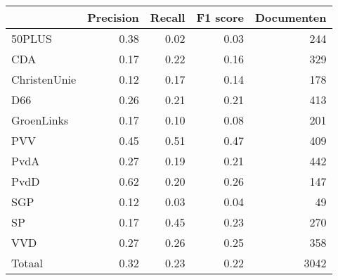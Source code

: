 \begin{tabular}{lrrrr}
\toprule
{} &  Precision &  Recall &  F1 score &  Documenten \\
\midrule
50PLUS       &       0.38 &    0.02 &      0.03 &         244 \\
CDA          &       0.17 &    0.22 &      0.16 &         329 \\
ChristenUnie &       0.12 &    0.17 &      0.14 &         178 \\
D66          &       0.26 &    0.21 &      0.21 &         413 \\
GroenLinks   &       0.17 &    0.10 &      0.08 &         201 \\
PVV          &       0.45 &    0.51 &      0.47 &         409 \\
PvdA         &       0.27 &    0.19 &      0.21 &         442 \\
PvdD         &       0.62 &    0.20 &      0.26 &         147 \\
SGP          &       0.12 &    0.03 &      0.04 &          49 \\
SP           &       0.17 &    0.45 &      0.23 &         270 \\
VVD          &       0.27 &    0.26 &      0.25 &         358 \\
Totaal       &       0.32 &    0.23 &      0.22 &        3042 \\
\bottomrule
\end{tabular}
